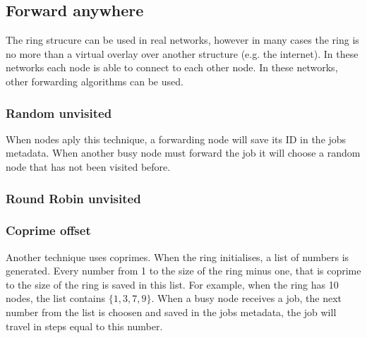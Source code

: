 \documentclass[10pt,a4paper,titlepage]{article}
\begin{document}

\subsection{Forward anywhere}
The ring strucure can be used in real networks, however in many cases the ring is no more than a virtual overlay over another structure (e.g. the internet). In these networks each node is able to connect to each other node. In these networks, other forwarding algorithms can be used.

\subsubsection{Random unvisited}


When nodes aply this technique, a forwarding node will save its ID in the jobs metadata. When another busy node must forward the job it will choose a random node that has not been visited before.


\subsubsection{Round Robin unvisited}

\subsubsection{Coprime offset}
Another technique uses coprimes. When the ring initialises, a list of numbers is generated. Every number from 1 to the size of the ring minus one, that is coprime to the size of the ring is saved in this list. For example, when the ring has 10 nodes, the list contains $\{1, 3 , 7 , 9\}$. When a busy node receives a job, the next number from the list is choosen and saved in the jobs metadata, the job will travel in steps equal to this number.
\end{document}

